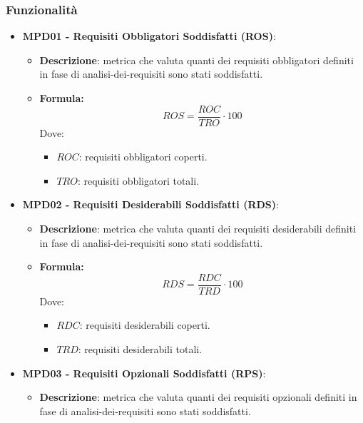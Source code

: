 \documentclass[10pt]{article}
\begin{document}
\begin{justify}
\subsubsection{Funzionalità}
\begin{itemize}
    \item   \textbf{MPD01 - Requisiti Obbligatori Soddisfatti (ROS)}:
            \begin{itemize}
                \item   \textbf{Descrizione}: metrica che valuta quanti dei requisiti obbligatori definiti in fase di analisi-dei-requisiti sono stati soddisfatti.
                \item   \textbf{Formula:}
                        \[
                        ROS = \frac{ROC}{TRO} \cdot 100
                        \]
                        Dove:
                        \begin{itemize}
                            \item $ROC$: requisiti obbligatori coperti.
                            \item $TRO$: requisiti obbligatori totali.
                        \end{itemize}
            \end{itemize}
    \item   \textbf{MPD02 - Requisiti Desiderabili Soddisfatti (RDS)}:
            \begin{itemize}
                \item   \textbf{Descrizione}: metrica che valuta quanti dei requisiti desiderabili definiti in fase di analisi-dei-requisiti sono stati soddisfatti.
                \item   \textbf{Formula:}
                        \[
                        RDS = \frac{RDC}{TRD} \cdot 100
                        \]
                        Dove:
                        \begin{itemize}
                            \item $RDC$: requisiti desiderabili coperti.
                            \item $TRD$: requisiti desiderabili totali.
                        \end{itemize}
            \end{itemize}
    \item   \textbf{MPD03 - Requisiti Opzionali Soddisfatti (RPS)}:
            \begin{itemize}
                \item   \textbf{Descrizione}: metrica che valuta quanti dei requisiti opzionali definiti in fase di analisi-dei-requisiti sono stati soddisfatti.

\end{itemize}
\end{itemize}
\end{justify}
\end{document}
